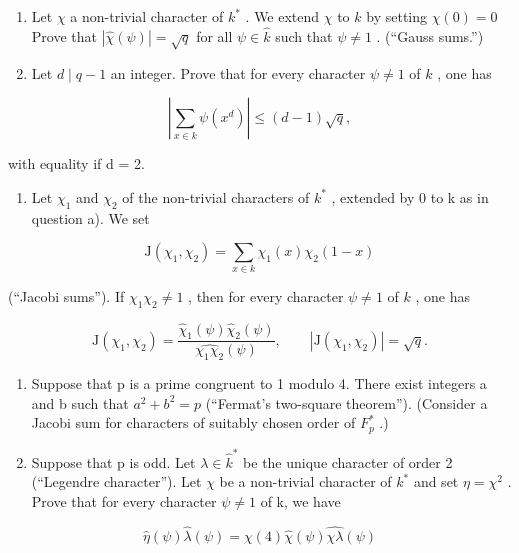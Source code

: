 \begin{enumerate}
\def\labelenumi{\alph{enumi})}
\item
  Let \(\chi\) a non-trivial character of \(k^{*}\) . We extend \(\chi\) to \(k\) by setting \(\chi(0) = 0\) Prove that \(|\widehat{\chi}(\psi)| = \sqrt{q}\) for all \(\psi \in \widehat{k}\) such that \(\psi \neq 1\) . (“Gauss sums.”)
\item
  Let \(d \mid q - 1\) an integer. Prove that for every character \(\psi \neq 1\) of \(k\) , one has
\end{enumerate}

\[
\left| \sum_ {x \in k} \psi (x ^ {d}) \right| \leqslant (d - 1) \sqrt {q},
\]

with equality if d = 2.

\begin{enumerate}
\def\labelenumi{\alph{enumi})}
\setcounter{enumi}{2}
\tightlist
\item
  Let \(\chi_{1}\) and \(\chi_{2}\) of the non-trivial characters of \(k^{*}\) , extended by 0 to k as in question a). We set
\end{enumerate}

\[
\mathrm{J} \left(\chi_ {1}, \chi_ {2}\right) = \sum_ {x \in k} \chi_ {1} (x) \chi_ {2} (1 - x)
\]

(“Jacobi sums”). If \(\chi_1\chi_2\neq 1\) , then for every character \(\psi \neq 1\) of \(k\) , one has

\[
\mathrm{J} (\chi_ {1}, \chi_ {2}) = \frac {\widehat {\chi} _ {1} (\psi) \widehat {\chi} _ {2} (\psi)}{\widehat {\chi_ {1} \chi_ {2}} (\psi)}, \qquad | \mathrm{J} (\chi_ {1}, \chi_ {2}) | = \sqrt {q}.
\]

\begin{enumerate}
\def\labelenumi{\alph{enumi})}
\setcounter{enumi}{3}
\item
  Suppose that p is a prime congruent to 1 modulo 4. There exist integers a and b such that \(a^{2} + b^{2} = p\) (“Fermat's two-square theorem”). (Consider a Jacobi sum for characters of suitably chosen order of \(F_{p}^{*}\) .)
\item
  Suppose that p is odd. Let \(\lambda \in \widehat{k}^{*}\) be the unique character of order 2 (“Legendre character”). Let \(\chi\) be a non-trivial character of \(k^{*}\) and set \(\eta = \chi^{2}\) . Prove that for every character \(\psi \neq 1\) of k, we have
\end{enumerate}

\[
\widehat {\eta} (\psi) \widehat {\lambda} (\psi) = \chi (4) \widehat {\chi} (\psi) \widehat {\chi \lambda} (\psi)
\]

